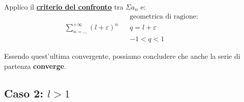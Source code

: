 \documentclass[../dimostrazioni]{subfiles}
\begin{document}
                Applico il \textbf{\hyperref[serieconfronto]{criterio del confronto}} tra \(\Sigma a_n\) e:
                \begin{align*}
                    && \text{geometrica di ragione:} \\
                    \sum_{n=\dots}^{+\infty} (l+\varepsilon)^{n} && q = l+ \varepsilon \\
                    && -1 < q < 1
                \end{align*}

                Essendo quest'ultima convergente, possiamo concludere che anche la serie di partenza \textbf{converge}.



            \subsection*{Caso 2: \(l > 1\)}




                        
\end{document}
